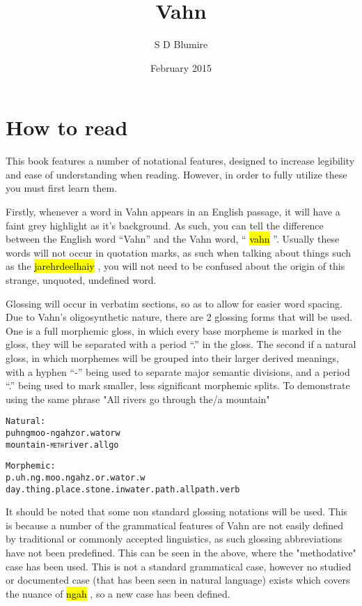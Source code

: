 \documentclass{article}
\title{Vahn}
\author{S D Blumire}
\date{February 2015}
\newcommand{\hlv}[2][gray]{ {\sethlcolor{#1} \hl{#2}} }
\begin{document}
\maketitle
\thispagestyle{empty}
\newpage

\tableofcontents
\listoftables
\newpage

\section{How to read}

This book features a number of notational features, designed to increase legibility and ease of understanding when reading. However, in order to fully utilize these you must first learn them.

Firstly, whenever a word in Vahn appears in an English passage, it will have a faint grey highlight as it's background. As such, you can tell the difference between the English word ``Vahn'' and the Vahn word, ``\hlv{vahn}''. Usually these words will not occur in quotation marks, as such when talking about things such as the \hlv{jarehrdeelhaiy}, you will not need to be confused about the origin of this strange, unquoted, undefined word.

Glossing will occur in verbatim sections, so as to allow for easier word spacing. Due to Vahn's oligosynthetic nature, there are 2 glossing forms that will be used. One is a full morphemic gloss, in which every base morpheme is marked in the gloss, they will be separated with a period ``.'' in the gloss. The second if a natural gloss, in which morphemes will be grouped into their larger derived meanings, with a hyphen ``-'' being used to separate major semantic divisions, and a period ``.'' being used to mark smaller, less significant morphemic splits. To demonstrate using the same phrase "All rivers go through the/a mountain"

\begin{alltt}
Natural:
puhngmoo-ngah zor.wa    torw
mountain-\textsc{meth} river.all go
\end{alltt}

\begin{alltt}
Morphemic:
p.uh.ng.moo.ngah         z.or.wa        tor.w
day.thing.place.stone.in water.path.all path.verb
\end{alltt}

It should be noted that some non standard glossing notations will be used. This is because a number of the grammatical features of Vahn are not easily defined by traditional or commonly accepted linguistics, as such glossing abbreviations have not been predefined. This can be seen in the above, where the "methodative" case has been used. This is not a standard grammatical case, however no studied or documented case (that has been seen in natural language) exists which covers the nuance of \hlv{ngah}, so a new case has been defined.
\end{document}
